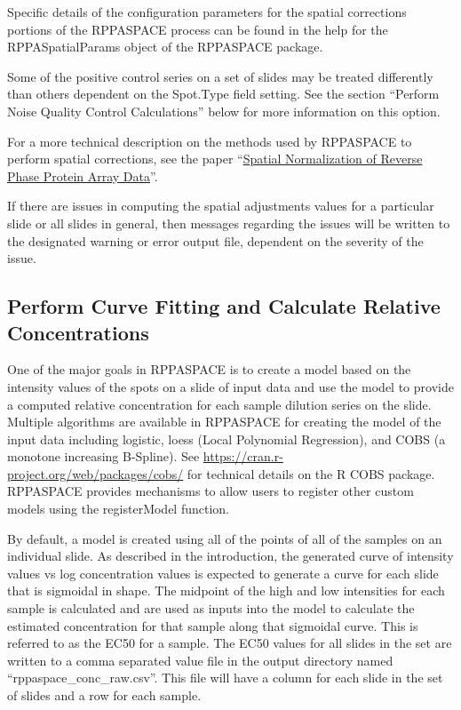 \documentclass[
]{article}
\begin{document}
Specific details of the configuration parameters for the spatial
corrections portions of the RPPASPACE process can be found in the help
for the RPPASpatialParams object of the RPPASPACE package.

Some of the positive control series on a set of slides may be treated
differently than others dependent on the Spot.Type field setting. See
the section ``Perform Noise Quality Control Calculations'' below for
more information on this option.

For a more technical description on the methods used by RPPASPACE to
perform spatial corrections, see the paper
``\href{https://www.ncbi.nlm.nih.gov/pmc/articles/PMC4264691/}{Spatial
Normalization of Reverse Phase Protein Array Data}''.

If there are issues in computing the spatial adjustments values for a
particular slide or all slides in general, then messages regarding the
issues will be written to the designated warning or error output file,
dependent on the severity of the issue.

\hypertarget{process_4}{%
\subsection{Perform Curve Fitting and Calculate Relative
Concentrations}\label{process_4}}

One of the major goals in RPPASPACE is to create a model based on the
intensity values of the spots on a slide of input data and use the model
to provide a computed relative concentration for each sample dilution
series on the slide. Multiple algorithms are available in RPPASPACE for
creating the model of the input data including logistic, loess (Local
Polynomial Regression), and COBS (a monotone increasing B-Spline). See
\url{https://cran.r-project.org/web/packages/cobs/} for technical
details on the R COBS package. RPPASPACE provides mechanisms to allow
users to register other custom models using the registerModel function.

By default, a model is created using all of the points of all of the
samples on an individual slide. As described in the introduction, the
generated curve of intensity values vs log concentration values is
expected to generate a curve for each slide that is sigmoidal in shape.
The midpoint of the high and low intensities for each sample is
calculated and are used as inputs into the model to calculate the
estimated concentration for that sample along that sigmoidal curve. This
is referred to as the EC50 for a sample. The EC50 values for all slides
in the set are written to a comma separated value file in the output
directory named ``rppaspace\_conc\_raw.csv''. This file will have a
column for each slide in the set of slides and a row for each sample.
\end{document}
